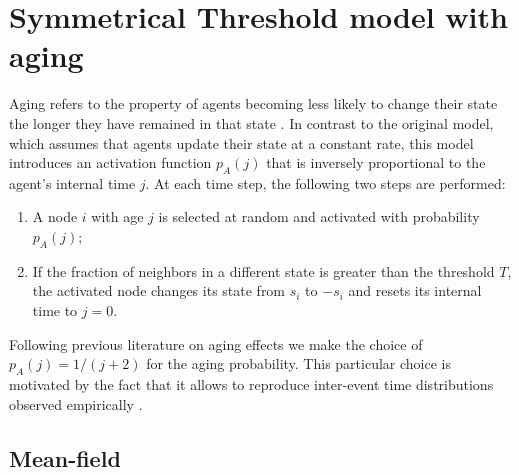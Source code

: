 \section{\label{Symmetrical Threshold model with aging} Symmetrical Threshold model with aging}
	
Aging refers to the property of agents becoming less likely to change their state the longer they have remained in that state \cite{stark-2008,artime-2017,artime-2018,peralta-2020A,peralta-2020C,chen-2020,Abella-2022,Abella-2022-AME}. In contrast to the original model, which assumes that agents update their state at a constant rate, this model introduces an activation function $p_A (j)$ that is inversely proportional to the agent's internal time $j$. At each time step, the following two steps are performed:
\begin{enumerate}
    \item A node $i$ with age $j$ is selected at random and activated with probability $p_A(j)$;
    \item If the fraction of neighbors in a different state is greater than the threshold $T$, the activated node changes its state from $s_i$ to $-s_i$ and resets its internal time to $j=0$.
\end{enumerate}
Following previous literature on aging effects \cite{fernandez-gracia-2011,peralta-2018,artime-2018,Abella-2022,Abella-2022-AME} we make the choice of $p_A(j) = 1/(j+2)$ for the aging probability. This particular choice is motivated by the fact that it allows to reproduce inter-event time distributions observed empirically \cite{rybski-2009,artime-2017}. 
\subsection{Mean-field}


